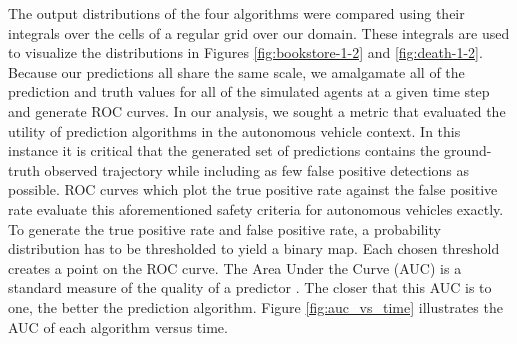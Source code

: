 \documentclass[letterpaper,10pt,conference]{ieeetran}
\begin{document}
The output distributions of the four algorithms were compared using their integrals over the cells of a regular grid over our domain. 
These integrals are used to visualize the distributions in Figures \ref{fig:bookstore-1-2} and \ref{fig:death-1-2}.
Because our predictions all share the same scale, we amalgamate all of the prediction and truth values for all of the simulated agents at a given time step and generate ROC curves.
In our analysis, we sought a metric that evaluated the utility of prediction algorithms in the autonomous vehicle context. 
	In this instance it is critical that the generated set of predictions contains the ground-truth observed trajectory while including as few false positive detections as possible.
	ROC curves which plot the true positive rate against the false positive rate evaluate this aforementioned safety criteria for autonomous vehicles exactly. 
	To generate the true positive rate and false positive rate, a probability distribution has to be thresholded to yield a binary map. 
	Each chosen threshold creates a point on the ROC curve. 
	The Area Under the Curve (AUC) is a standard measure of the quality of a predictor \cite{judd2009}.  
	The closer that this AUC is to one, the better the prediction algorithm.
	Figure \ref{fig:auc_vs_time} illustrates the AUC of each algorithm versus time. 
	
\end{document}
